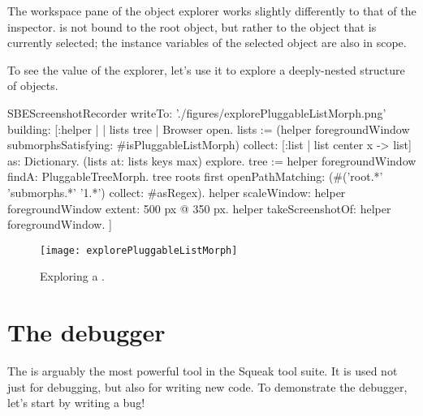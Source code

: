 \documentclass[a4paper,10pt,twoside]{book}
\begin{document}
The workspace pane of the object explorer works slightly differently to that of the inspector.
 is not bound to the root object, but rather to the object that is currently selected; the instance variables of the selected object are also in scope.

To see the value of the explorer, let's use it to explore a deeply-nested structure of objects.


\begin{ExecuteSmalltalkScript}
SBEScreenshotRecorder writeTo: './figures/explorePluggableListMorph.png' building: [:helper |
	| lists tree |
	Browser open.
	lists := (helper foregroundWindow submorphsSatisfying: #isPluggableListMorph)
		collect: [:list | list center x -> list] as: Dictionary.
	(lists at: lists keys max) explore.
	tree := helper foregroundWindow findA: PluggableTreeMorph.
	tree roots first openPathMatching: (#('root.*' 'submorphs.*' '1.*') collect: #asRegex).
	helper scaleWindow: helper foregroundWindow extent: 500 px @ 350 px.
	helper takeScreenshotOf: helper foregroundWindow.
]
\end{ExecuteSmalltalkScript}
\begin{figure}[tbp]
	\begin{center}
		\texttt{[image: explorePluggableListMorph]}
	\end{center}
	\caption{Exploring a .}
	\label{fig:explorePluggableListMorph}
\end{figure}

\section{The debugger}
\label{sec:debugger} %

The  is arguably the most powerful tool in the Squeak tool suite.
It is used not just for debugging, but also for writing new code.
To demonstrate the debugger, let's start by writing a bug!
\end{document}
